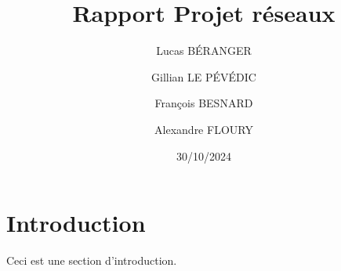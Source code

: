 \documentclass[a4paper,12pt]{report}
\title{Rapport Projet réseaux}
\author{
    Lucas BÉRANGER \and
    Gillian LE PÉVÉDIC \and
    François BESNARD \and
    Alexandre FLOURY \and
}
\date{30/10/2024}
\begin{document}
    \maketitle  
    \newpage

    \tableofcontents
    \newpage

    \chapter{Introduction}
        Ceci est une section d'introduction.
\end{document}
